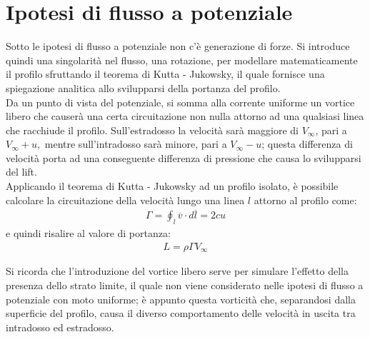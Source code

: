 \section{Ipotesi di flusso a potenziale}
Sotto le ipotesi di flusso a potenziale non c'è generazione di forze. Si introduce quindi una singolarità nel flusso, una rotazione, per modellare matematicamente il profilo sfruttando il teorema di Kutta - Jukowsky, il quale fornisce una spiegazione analitica allo svilupparsi della portanza del profilo.\\
Da un punto di vista del potenziale, si somma alla corrente uniforme un vortice libero che causerà una certa circuitazione non nulla attorno ad una qualsiasi linea che racchiude il profilo. Sull'estradosso la velocità sarà maggiore di $V_{\infty}$, pari a $V_{\infty}+u,$ mentre sull'intradosso sarà minore, pari a $V_{\infty}-u$; questa differenza di velocità porta ad una conseguente differenza di pressione che causa lo svilupparsi del lift.\\
Applicando il teorema di Kutta - Jukowsky ad un profilo isolato, è possibile calcolare la circuitazione della velocità lungo una linea $l$ attorno al profilo come:
\begin{align*}
\Gamma = \oint_l \overline{v} \cdot d \overline{l} = 2cu
\end{align*}
e quindi risalire al valore di portanza:
\begin{align*}
L=\rho \Gamma V_\infty
\end{align*}

Si ricorda che l'introduzione del vortice libero serve per simulare l'effetto della presenza dello strato limite, il quale non viene considerato nelle ipotesi di flusso a potenziale con moto uniforme; è appunto questa vorticità che, separandosi dalla superficie del profilo, causa il diverso comportamento delle velocità in uscita tra intradosso ed estradosso.

